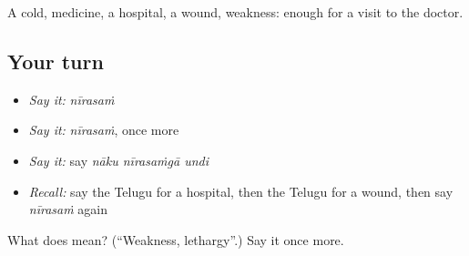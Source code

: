 \begin{grammarlens}[title={What you've built}]
A cold, medicine, a hospital, a wound, weakness: enough for a visit to the doctor.
\end{grammarlens}

\subsection*{Your turn}
\begin{itemize}
\raggedright
  \item \emph{Say it:} \emph{nīrasaṁ}
  \item \emph{Say it:} \emph{nīrasaṁ}, once more
  \item \emph{Say it:} say \emph{nāku nīrasaṁgā undi}
  \item \emph{Recall:} say the Telugu for a hospital, then the Telugu for a wound, then say \emph{nīrasaṁ} again
\end{itemize}

\begin{tcolorbox}[breakable,colback=teal!4,colframe=teal!35!black,title={Before you move on}]
What does  mean? (\textquotedblleft{}Weakness, lethargy\textquotedblright{}.) Say it once more.
\end{tcolorbox}
